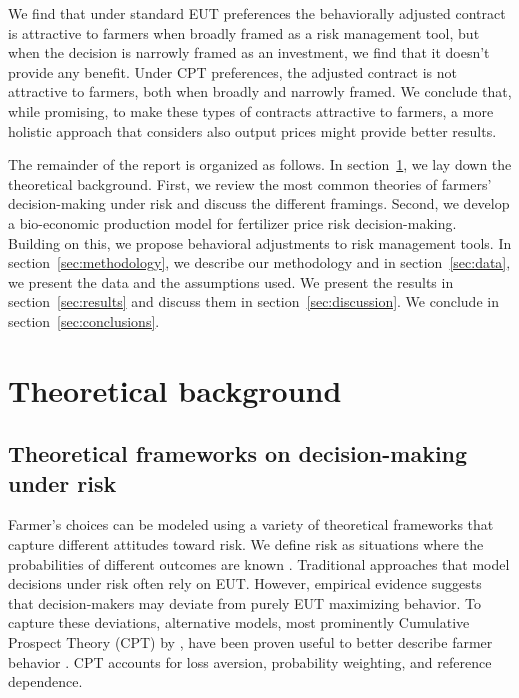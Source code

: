 \documentclass[12pt,a4paper]{article}
\begin{document}
We find that under standard EUT preferences the behaviorally adjusted contract is attractive to farmers when broadly framed as a risk management tool, but when the decision is narrowly framed as an investment, we find that it doesn't provide any benefit. Under CPT preferences, the adjusted contract is not attractive to farmers, both when broadly and narrowly framed. We conclude that, while promising, to make these types of contracts attractive to farmers, a more holistic approach that considers also output prices might provide better results.

The remainder of the report is organized as follows. In section~\ref{sec:theory}, we lay down the theoretical background. First, we review the most common theories of farmers' decision-making under risk and discuss the different framings. Second, we develop a bio-economic production model for fertilizer price risk decision-making. Building on this, we propose behavioral adjustments to risk management tools. In section~\ref{sec:methodology}, we describe our methodology and in section~\ref{sec:data}, we present the data and the assumptions used. We present the results in section~\ref{sec:results} and discuss them in section~\ref{sec:discussion}. We conclude in section~\ref{sec:conclusions}.

\section{Theoretical background}
\label{sec:theory}

\subsection{Theoretical frameworks on decision-making under risk}

Farmer's choices can be modeled using a variety of theoretical frameworks that capture different attitudes toward risk. We define risk as situations where the probabilities of different outcomes are known \citep{Knight1921}. Traditional approaches that model decisions under risk often rely on EUT. However, empirical evidence suggests that decision-makers may deviate from purely EUT maximizing behavior. To capture these deviations, alternative models, most prominently Cumulative Prospect Theory (CPT) by \citet{TverskyKahneman1992}, have been proven useful to better describe farmer behavior \citep{Rommel2023}. CPT accounts for loss aversion, probability weighting, and reference dependence.
\end{document}
